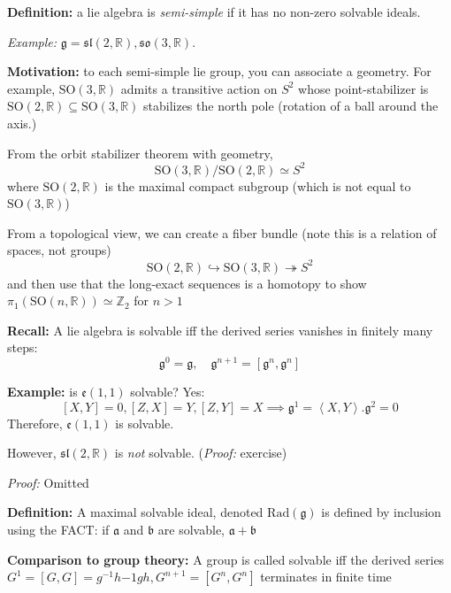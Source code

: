 \documentclass[12pt]{article}
\newcommand{\R}{\mathbb{R}}
\newcommand{\Z}{\mathbb{Z}}
\newcommand{\brak}[1]{\left\langle #1 \right\rangle}
\newcommand{\SO}{\text{SO}}
\newcommand{\g}{\mathfrak{g}}
\newcommand{\h}{\mathfrak{h}}
\renewcommand{\sl}{\mathfrak{sl}}
\newenvironment*{tbox}[2][gray]{
    \begin{tcolorbox}[
        parbox=false,
        colback=#1!5!white,
        colframe=#1!75!black,
        breakable,
        title={#2}
    ]}
    {\end{tcolorbox}}
\begin{document}
    \textbf{Definition:} a lie algebra is \emph{semi-simple} if it has no non-zero solvable ideals.

    \emph{Example:} $\g = \sl(2, \R), \mathfrak{so}(3, \R)$.
    
    \textbf{Motivation:} to each semi-simple lie group, you can associate a geometry. For example, $\SO(3, \R)$ admits a transitive action on $S^2$ whose point-stabilizer is $\SO(2, \R) \subseteq \SO(3, \R)$ stabilizes the north pole (rotation of a ball around the axis.) 

    From the orbit stabilizer theorem with geometry, 
    \[\SO(3, \R)/\SO(2, \R) \simeq S^2\]
    where $\SO(2, \R)$ is the maximal compact subgroup (which is not equal to $\SO(3, \R)$)

    From a topological view, we can create a fiber bundle (note this is a relation of spaces, not groups)
    \[\SO(2, \R) \hookrightarrow \SO(3, \R) \twoheadrightarrow S^2\]
    and then use that the long-exact sequences is a homotopy to show $\pi_1(\SO(n, \R)) \simeq \Z_2$ for $n > 1$ 

    \textbf{Recall:} A lie algebra is solvable iff the derived series vanishes in finitely many steps: 
    \[\g^0 = \g, \quad \g^{n+1} = [\g^n, \g^n]\]

    \textbf{Example:} is $\mathfrak{e}(1, 1)$ solvable? Yes:
    \[[X, Y] = 0, [Z, X] = Y, [Z, Y] = X \implies \g^1 = \brak{X, Y}. \g^2 = 0\] 
    Therefore, $\mathfrak{e}(1, 1)$ is solvable.

    However, $\sl(2, \R)$ is \emph{not} solvable. (\emph{Proof:} exercise) 

    \begin{tbox}{\textbf{Theorem (Levi decomposition):} Every finite dimensional lie algebra fits into a short exact sequence 
        \[\h \hookrightarrow \g \twoheadrightarrow \g/\h\]
        where $\h$ is the unique maximal solvable ideal and $\g/\h$ is semi-simple. Further, this sequence is split. (Though this is much harder to show)}
        \emph{Proof:} Omitted 
    \end{tbox}

    \textbf{Definition:} A maximal solvable ideal, denoted $\text{Rad}(\g)$ is defined by inclusion using the FACT: if $\mathfrak{a}$ and $\mathfrak{b}$ are solvable, $\mathfrak{a} + \mathfrak{b}$

    \textbf{Comparison to group theory:}  A group is called solvable iff the derived series $G^1 = [G, G] = g^{-1}h{-1}gh, G^{n+1} = [G^n, G^n]$ terminates in finite time 
\end{document}
